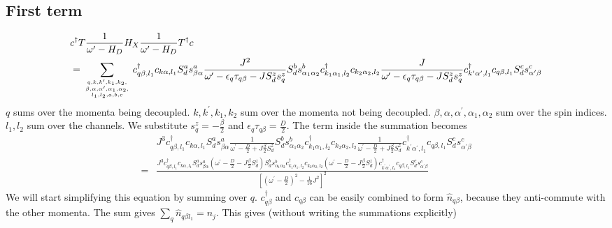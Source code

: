 \documentclass{revtex4-2}
\numberwithin{equation}{section}
\begin{document}
\subsection{First term}
\begin{equation}\begin{aligned}
	&c^\dagger T \frac{1}{\omega^\prime - H_D} H_X \frac{1}{\omega^\prime - H_D} T^\dagger c\\
	&= \sum_{q, k, k^\prime, k_1,k_2,\atop{\beta, \alpha, \alpha^\prime, \alpha_1,\alpha_2,\atop{l_1,l_2,a,b,c}}} c^\dagger_{q\beta,l_1} c_{k\alpha,l_1} S_d^a s^a_{\beta \alpha} \frac{J^2}{\omega^\prime - \epsilon_q\tau_{q\beta} - J S_d^z s_q^z} S_d^b s^b_{\alpha_1 \alpha_2} c^\dagger_{k_1\alpha_1,l_2}c_{k_2 \alpha_2,l_2} \frac{J}{\omega^\prime - \epsilon_q\tau_{q\beta} - J S_d^z s_q^z} c^\dagger_{k^\prime\alpha^\prime, l_1} c_{q\beta, l_1} S_d^c s^c_{\alpha^\prime \beta}
\end{aligned}\end{equation}
\(q\) sums over the momenta being decoupled. \(k, k^\prime, k_1,k_2\) sum over the momenta not being decoupled. \(\beta, \alpha, \alpha^\prime, \alpha_1,\alpha_2\) sum over the spin indices. \(l_1,l_2\) sum over the channels. We substitute \(s_q^z = -\frac{\beta}{2}\) and \(\epsilon_q \tau_{q\beta} = \frac{D}{2}\). The term inside the summation becomes
\begin{equation}\begin{aligned}
	&J^3 c^\dagger_{q\beta,l_1} c_{k\alpha,l_1} S_d^a s^a_{\beta \alpha} \frac{1}{\omega^\prime - \frac{D}{2} + J \frac{\beta}{2}S_d^z} S_d^b s^b_{\alpha_1 \alpha_2} c^\dagger_{k_1\alpha_1,l_2}c_{k_2 \alpha_2,l_2} \frac{1}{\omega^\prime - \frac{D}{2} + J \frac{\beta}{2}S_d^z} c^\dagger_{k^\prime\alpha^\prime, l_1} c_{q\beta, l_1} S_d^c s^c_{\alpha^\prime \beta}\\
	=&\frac{J^3 c^\dagger_{q\beta,l_1} c_{k\alpha,l_1} S_d^a s^a_{\beta \alpha} \left(\omega^\prime - \frac{D}{2} - J \frac{\beta}{2}S_d^z\right)S_d^b s^b_{\alpha_1 \alpha_2} c^\dagger_{k_1\alpha_1,l_2}c_{k_2 \alpha_2,l_2} \left(\omega^\prime - \frac{D}{2} - J \frac{\beta}{2}S_d^z\right) c^\dagger_{k^\prime\alpha^\prime, l_1} c_{q\beta, l_1} S_d^c s^c_{\alpha^\prime \beta}}{\left[\left(\omega^\prime - \frac{D}{2}\right)^2 - \frac{1}{16}J^2\right]^2} 
\end{aligned}\end{equation}
We will start simplifying this equation by summing over \(q\). \(c^\dagger_{q\beta}\) and \(c_{q\beta}\) can be easily combined to form \(\hat n_{q\beta}\), because they anti-commute with the other momenta. The sum gives \(\sum_q \hat n_{q\beta l_1} = n_j \). This gives (without writing the summations explicitly)
\end{document}
